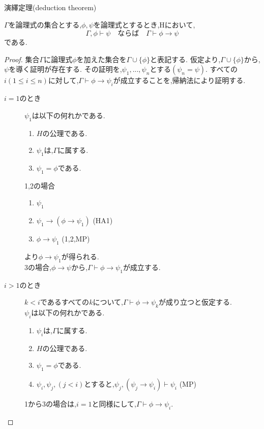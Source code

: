 \begin{thm}
 演繹定理(deduction theorem)

 $\Gamma$を論理式の集合とする,$\phi,\psi$を論理式とするとき,Hにおいて,
 \begin{equation*}
  \Gamma, \phi \vdash \psi \quad ならば \quad \Gamma \vdash \phi \to \psi
 \end{equation*}
 である.

\end{thm}
\begin{proof}
 集合$\Gamma$に論理式$\phi$を加えた集合を$\Gamma \cup \{\phi\}$と表記する.
 仮定より,$\Gamma \cup \{\phi\}$から,$\psi$を導く証明が存在する.
 その証明を,$\psi_1,...,\psi_n$とする$(\psi_n=\psi)$.
 すべての$i(1 \leq i \leq n)$に対して,$\Gamma \vdash \phi \to \psi_i$が成立することを,帰納法により証明する.
 \begin{description}
  \item[$i=1$のとき] $\psi_1$は以下の何れかである.
			 \begin{enumerate}
			  \item $H$の公理である.
			  \item $\psi_1$は,$\Gamma$に属する.
			  \item $\psi_1=\phi$である.
			 \end{enumerate}
			 1,2の場合
			 \begin{enumerate}
			  \renewcommand{\labelenumi}{\arabic{enumi})}
			  \item $\psi_1$
			  \item $\psi_1 \to (\phi \to \psi_1)$ (HA1)
			  \item $\phi \to \psi_1$ (1,2,MP)
			 \end{enumerate}
			 より$\phi \to \psi_1$が得られる. \\
			 3の場合,$\phi \to \psi$から,$\Gamma \vdash \phi \to \psi_1$が成立する.
  \item[$i>1$のとき]
			 $k<i$であるすべての$k$について,$\Gamma \vdash \phi \to \psi_k$が成り立つと仮定する. \\
			 $\psi_i$は以下の何れかである.
			 \begin{enumerate}
			  \item $\psi_i$は,$\Gamma$に属する.
			  \item $H$の公理である.
			  \item $\psi_1=\phi$である.
			  \item $\psi_i,\psi_j,(j<i)$とすると,$\psi_j,(\psi_j\to\psi_i)\vdash\psi_i$ (MP)
			 \end{enumerate}
			 1から3の場合は,$i=1$と同様にして,$\Gamma \vdash \phi \to \psi_i$. \\

\end{description}
\end{proof}
